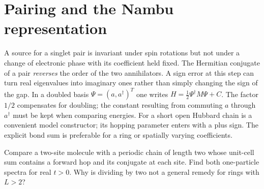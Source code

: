 \section{Pairing and the Nambu representation}
A source for a singlet pair is invariant under spin rotations but not
under a change of electronic phase with its coefficient held fixed.
The Hermitian conjugate of a pair \emph{reverses} the order of the
two annihilators. A sign error at this step can turn real eigenvalues
into imaginary ones rather than simply changing the sign of the gap.
In a doubled basis $\Psi=(a,a^\dagger)^T$ one writes
$H=\frac12\Psi^\dagger M\Psi+C$. The factor $1/2$ compensates for
doubling; the constant resulting from commuting $a$ through
$a^\dagger$ must be kept when comparing energies. For a short open
Hubbard chain  is a convenient model constructor;
its hopping parameter enters with a plus sign. The explicit bond sum
is preferable for a ring or spatially varying coefficients.
\begin{exercise}\label{ex:bond}
Compare a two-site molecule with a periodic chain of length two whose
unit-cell sum contains a forward hop and its conjugate at each site.
Find both one-particle spectra for real $t>0$. Why is dividing by
two not a general remedy for rings with $L>2$?
\end{exercise}
